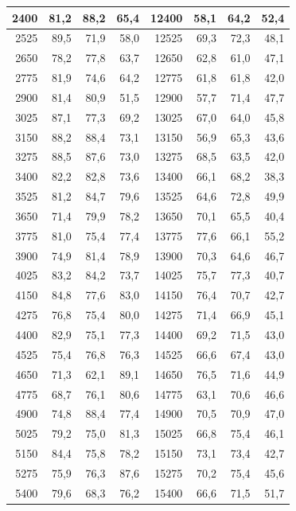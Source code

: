 \begin{small}
\begin{longtable}{|r|r|r|r|r|r|r|r|}
2400 & 81,2 & 88,2 & 65,4 & 12400 & 58,1 & 64,2 & 52,4 \\ \hline
2525 & 89,5 & 71,9 & 58,0 & 12525 & 69,3 & 72,3 & 48,1 \\ \hline
2650 & 78,2 & 77,8 & 63,7 & 12650 & 62,8 & 61,0 & 47,1 \\ \hline
2775 & 81,9 & 74,6 & 64,2 & 12775 & 61,8 & 61,8 & 42,0 \\ \hline
2900 & 81,4 & 80,9 & 51,5 & 12900 & 57,7 & 71,4 & 47,7 \\ \hline
3025 & 87,1 & 77,3 & 69,2 & 13025 & 67,0 & 64,0 & 45,8 \\ \hline
3150 & 88,2 & 88,4 & 73,1 & 13150 & 56,9 & 65,3 & 43,6 \\ \hline
3275 & 88,5 & 87,6 & 73,0 & 13275 & 68,5 & 63,5 & 42,0 \\ \hline
3400 & 82,2 & 82,8 & 73,6 & 13400 & 66,1 & 68,2 & 38,3 \\ \hline
3525 & 81,2 & 84,7 & 79,6 & 13525 & 64,6 & 72,8 & 49,9 \\ \hline
3650 & 71,4 & 79,9 & 78,2 & 13650 & 70,1 & 65,5 & 40,4 \\ \hline
3775 & 81,0 & 75,4 & 77,4 & 13775 & 77,6 & 66,1 & 55,2 \\ \hline
3900 & 74,9 & 81,4 & 78,9 & 13900 & 70,3 & 64,6 & 46,7 \\ \hline
4025 & 83,2 & 84,2 & 73,7 & 14025 & 75,7 & 77,3 & 40,7 \\ \hline
4150 & 84,8 & 77,6 & 83,0 & 14150 & 76,4 & 70,7 & 42,7 \\ \hline
4275 & 76,8 & 75,4 & 80,0 & 14275 & 71,4 & 66,9 & 45,1 \\ \hline
4400 & 82,9 & 75,1 & 77,3 & 14400 & 69,2 & 71,5 & 43,0 \\ \hline
4525 & 75,4 & 76,8 & 76,3 & 14525 & 66,6 & 67,4 & 43,0 \\ \hline
4650 & 71,3 & 62,1 & 89,1 & 14650 & 76,5 & 71,6 & 44,9 \\ \hline
4775 & 68,7 & 76,1 & 80,6 & 14775 & 63,1 & 70,6 & 46,6 \\ \hline
4900 & 74,8 & 88,4 & 77,4 & 14900 & 70,5 & 70,9 & 47,0 \\ \hline
5025 & 79,2 & 75,0 & 81,3 & 15025 & 66,8 & 75,4 & 46,1 \\ \hline
5150 & 84,4 & 75,8 & 78,2 & 15150 & 73,1 & 73,4 & 42,7 \\ \hline
5275 & 75,9 & 76,3 & 87,6 & 15275 & 70,2 & 75,4 & 45,6 \\ \hline
5400 & 79,6 & 68,3 & 76,2 & 15400 & 66,6 & 71,5 & 51,7 \\ \hline

\end{longtable}
\end{small}
